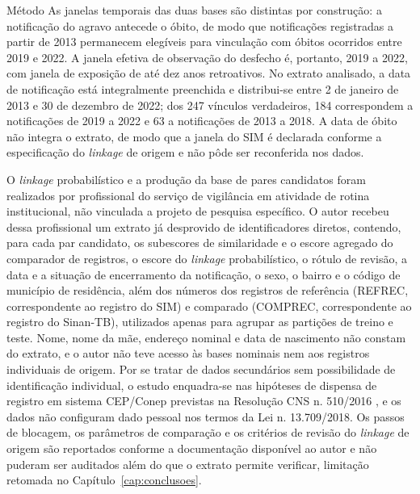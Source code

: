 \begin{chapter}{Método}
As janelas temporais das duas bases são distintas por construção: a notificação do agravo antecede o óbito, de modo que notificações registradas a partir de 2013 permanecem elegíveis para vinculação com óbitos ocorridos entre 2019 e 2022. A janela efetiva de observação do desfecho é, portanto, 2019 a 2022, com janela de exposição de até dez anos retroativos. No extrato analisado, a data de notificação está integralmente preenchida e distribui-se entre 2 de janeiro de 2013 e 30 de dezembro de 2022; dos 247 vínculos verdadeiros, 184 correspondem a notificações de 2019 a 2022 e 63 a notificações de 2013 a 2018. A data de óbito não integra o extrato, de modo que a janela do SIM é declarada conforme a especificação do \textit{linkage} de origem e não pôde ser reconferida nos dados.

O \textit{linkage} probabilístico e a produção da base de pares candidatos foram realizados por profissional do serviço de vigilância em atividade de rotina institucional, não vinculada a projeto de pesquisa específico. O autor recebeu dessa profissional um extrato já desprovido de identificadores diretos, contendo, para cada par candidato, os subescores de similaridade e o escore agregado do comparador de registros, o escore do \textit{linkage} probabilístico, o rótulo de revisão, a data e a situação de encerramento da notificação, o sexo, o bairro e o código de município de residência, além dos números dos registros de referência (REFREC, correspondente ao registro do SIM) e comparado (COMPREC, correspondente ao registro do Sinan-TB), utilizados apenas para agrupar as partições de treino e teste. Nome, nome da mãe, endereço nominal e data de nascimento não constam do extrato, e o autor não teve acesso às bases nominais nem aos registros individuais de origem. Por se tratar de dados secundários sem possibilidade de identificação individual, o estudo enquadra-se nas hipóteses de dispensa de registro em sistema CEP/Conep previstas na Resolução CNS n. 510/2016 \cite{BrasilCNS2016}, e os dados não configuram dado pessoal nos termos da Lei n. 13.709/2018. Os passos de blocagem, os parâmetros de comparação e os critérios de revisão do \textit{linkage} de origem são reportados conforme a documentação disponível ao autor e não puderam ser auditados além do que o extrato permite verificar, limitação retomada no Capítulo~\ref{cap:conclusoes}.


\end{chapter}

